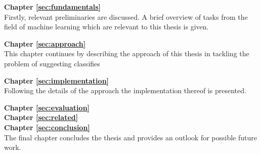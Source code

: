 \textbf{Chapter \ref{sec:fundamentals}} \\[0.2em]
Firstly, relevant preliminaries are discussed. A brief overview of tasks from the field of machine learning which are relevant to this thesis is given.

\textbf{Chapter \ref{sec:approach}} \\[0.2em]
This chapter continues by describing the approach of this thesis in tackling the problem of suggesting classifies

\textbf{Chapter \ref{sec:implementation}} \\[0.2em]
Following the details of the approach the implementation thereof is presented.

\textbf{Chapter \ref{sec:evaluation}} \\[0.2em]

\textbf{Chapter \ref{sec:related}} \\[0.2em]


\textbf{Chapter \ref{sec:conclusion}} \\[0.2em]
The final chapter concludes the thesis and provides an outlook for possible future work.

